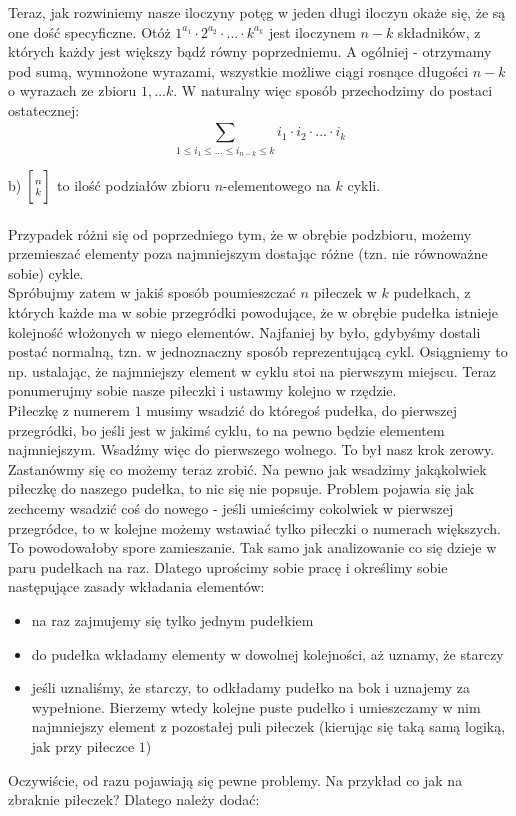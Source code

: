 \documentclass[a4paper,11pt]{article}
\begin{document}
{Teraz, jak rozwiniemy nasze iloczyny potęg w jeden długi iloczyn okaże się, że są one dość specyficzne. Otóż $1^{a_{1}} \cdot 2^{a_{2}} \cdot ... \cdot k^{a_{k}}$ jest iloczynem $n-k$ składników, z których każdy jest większy bądź równy poprzedniemu. A ogólniej - otrzymamy pod sumą, wymnożone wyrazami, wszystkie możliwe ciągi rosnące długości $n-k$ o wyrazach ze zbioru ${1, ... k}$. W naturalny więc sposób przechodzimy do postaci ostatecznej:
\[
  \sum_{1 \le i_{1} \le ... \le i_{n-k} \le k }^{} i_{1} \cdot i_{2} \cdot ... \cdot i_{k}
\]

\Large b)  $ \bigg[ {n \atop k} \bigg] $ \small to ilość podziałów zbioru $n$-elementowego na $k$ cykli.\\ \\
Przypadek różni się od poprzedniego tym, że w obrębie podzbioru, możemy przemieszać elementy poza najmniejszym dostając różne (tzn. nie równoważne sobie) cykle. \\

Spróbujmy zatem w jakiś sposób poumieszczać $n$ piłeczek w $k$ pudełkach, z których każde ma w sobie przegródki powodujące, że w obrębie pudełka istnieje kolejność włożonych w niego elementów. Najfaniej by było, gdybyśmy dostali postać normalną, tzn. w jednoznaczny sposób reprezentującą cykl. Osiągniemy to np. ustalając, że najmniejszy element w cyklu stoi na pierwszym miejscu. Teraz ponumerujmy sobie nasze piłeczki i ustawmy kolejno w rzędzie.\\
Piłeczkę z numerem $1$ musimy wsadzić do któregoś pudełka, do pierwszej przegródki, bo jeśli jest w jakimś cyklu, to na pewno będzie elementem najmniejszym. Wsadźmy więc do pierwszego wolnego. To był nasz krok zerowy. Zastanówmy się co możemy teraz zrobić. Na pewno jak wsadzimy jakąkolwiek piłeczkę do naszego pudełka, to nic się nie popsuje. Problem pojawia się jak zechcemy wsadzić coś do nowego - jeśli umieścimy cokolwiek w pierwszej przegródce, to w kolejne możemy wstawiać tylko piłeczki o numerach większych. To powodowałoby spore zamieszanie. Tak samo jak analizowanie co się dzieje w paru pudełkach na raz. Dlatego uprościmy sobie pracę i określimy sobie następujące zasady wkładania elementów:\\
\begin{itemize}
  \item na raz zajmujemy się tylko jednym pudełkiem
  \item do pudełka wkładamy elementy w dowolnej kolejności, aż uznamy, że starczy\\
  \item jeśli uznaliśmy, że starczy, to odkładamy pudełko na bok i uznajemy za wypełnione. Bierzemy wtedy kolejne puste pudełko i umieszczamy w nim najmniejszy element z pozostałej puli piłeczek (kierując się taką samą logiką, jak przy piłeczce $1$)
\end{itemize}
Oczywiście, od razu pojawiają się pewne problemy. Na przykład co jak na zbraknie piłeczek? Dlatego należy dodać:

}
\end{document}
